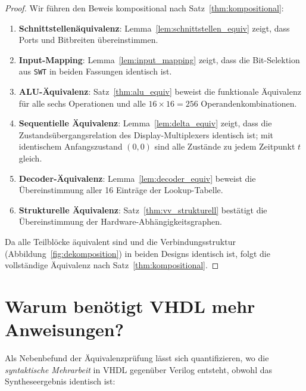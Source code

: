 ﻿\documentclass[12pt,a4paper]{report}
\begin{document}
\begin{proof}
	Wir führen den Beweis kompositional nach Satz~\ref{thm:kompositional}:
	
	\begin{enumerate}
		\item \textbf{Schnittstellenäquivalenz}: Lemma~\ref{lem:schnittstellen_equiv}
		zeigt, dass Ports und Bitbreiten überein\-stimmen.
		\item \textbf{Input-Mapping}: Lemma~\ref{lem:input_mapping} zeigt, dass
		die Bit-Selektion aus \texttt{SWT} in beiden Fassungen identisch ist.
		\item \textbf{ALU-Äquivalenz}: Satz~\ref{thm:alu_equiv} beweist die
		funktionale Äquivalenz für alle sechs Operationen und alle
		$16 \times 16 = 256$ Operandenkombinationen.
		\item \textbf{Sequentielle Äquivalenz}: Lemma~\ref{lem:delta_equiv} zeigt,
		dass die Zustandsübergangsrelation des Display-Multiplexers identisch
		ist; mit identischem Anfangszustand $(0,0)$ sind alle Zustände
		zu jedem Zeitpunkt $t$ gleich.
		\item \textbf{Decoder-Äquivalenz}: Lemma~\ref{lem:decoder_equiv} beweist
		die Übereinstimmung aller 16 Einträge der Lookup-Tabelle.
		\item \textbf{Strukturelle Äquivalenz}: Satz~\ref{thm:vv_strukturell}
		bestätigt die Übereinstimmung der Hardware-Abhängigkeitsgraphen.
	\end{enumerate}
	
	Da alle Teilblöcke äquivalent sind und die Verbindungsstruktur
	(Abbildung~\ref{fig:dekomposition}) in beiden Designs identisch ist, folgt
	die vollständige Äquivalenz nach Satz~\ref{thm:kompositional}.
\end{proof}

\section{Warum benötigt VHDL mehr Anweisungen?}

Als Nebenbefund der Äquivalenzprüfung lässt sich quantifizieren, wo die
\emph{syntaktische Mehrarbeit} in VHDL gegenüber Verilog entsteht, obwohl das
Syntheseergebnis identisch ist:
\end{document}

